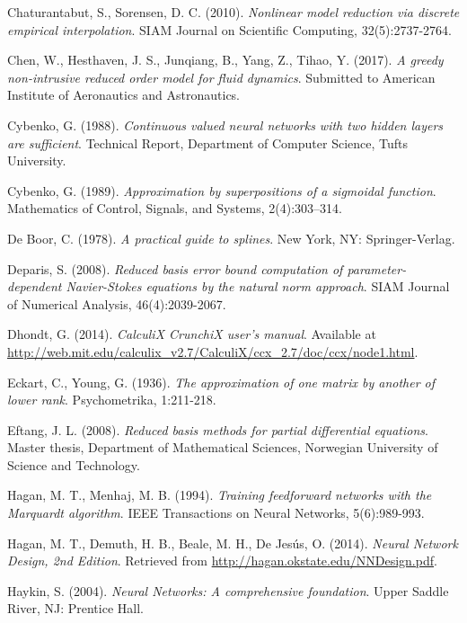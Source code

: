 \documentclass[longtitle]{elsarticle}
\numberwithin{equation}{section}
\theoremstyle{theorem}
\theoremstyle{definition}
\theoremstyle{remark}
\theoremstyle{proposition}
\numberwithin{figure}{section}
\begin{document}
\begin{thebibliography}{50}
		Chaturantabut, S., Sorensen, D. C. (2010). \emph{Nonlinear model reduction via discrete empirical interpolation}. SIAM Journal on Scientific Computing, 32(5):2737-2764.
		
		Chen, W., Hesthaven, J. S., Junqiang, B., Yang, Z., Tihao, Y. (2017). \emph{A greedy non-intrusive reduced order model for fluid dynamics}. Submitted to American Institute of Aeronautics and Astronautics.
	
		Cybenko, G. (1988). \emph{Continuous valued neural networks with two hidden layers are sufficient}. Technical Report, Department of Computer Science, Tufts University.
		
		Cybenko, G. (1989). \emph{Approximation by superpositions of a sigmoidal function}. Mathematics of Control, Signals, and Systems, 2(4):303–314.
		
		De Boor, C. (1978). \emph{A practical guide to splines}. New York, NY: Springer-Verlag.
		
		Deparis, S. (2008). \emph{Reduced basis error bound computation of parameter-dependent Navier-Stokes equations by the natural norm approach}. SIAM Journal of Numerical Analysis, 46(4):2039-2067.
		
		Dhondt, G. (2014). \emph{CalculiX CrunchiX user's manual}. Available at \url{http://web.mit.edu/calculix_v2.7/CalculiX/ccx_2.7/doc/ccx/node1.html}.
		
		Eckart, C., Young, G. (1936). \emph{The approximation of one matrix by another of lower rank}. Psychometrika, 1:211-218.
		
		Eftang, J. L. (2008). \emph{Reduced basis methods for partial differential equations}. Master thesis, Department of Mathematical Sciences, Norwegian University of Science and Technology.
		
		Hagan, M. T., Menhaj, M. B. (1994). \emph{Training feedforward networks with the Marquardt algorithm}. IEEE Transactions on Neural Networks, 5(6):989-993.
		
		Hagan, M. T., Demuth, H. B., Beale, M. H., De Jes\'us, O. (2014). \emph{Neural Network Design, 2nd Edition}. Retrieved from \url{http://hagan.okstate.edu/NNDesign.pdf}.
		
		Haykin, S. (2004). \emph{Neural Networks: A comprehensive foundation}. Upper Saddle River, NJ: Prentice Hall.
		

\end{thebibliography}
\end{document}
